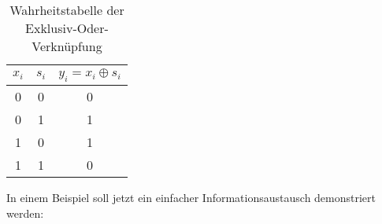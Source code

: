 \begin{table}
  \centering
  \caption{Wahrheitstabelle der Exklusiv-Oder-Verknüpfung}
  \begin{tabular}{cc|c}
    $x_i$ & $s_i$ & $y_i = x_i \oplus s_i$ \\ \hline
    0     & 0     & 0                      \\
    0     & 1     & 1                      \\ \hline
    1     & 0     & 1                      \\
    1     & 1     & 0                      \\
  \end{tabular}
  \label{tab:truth-table-xor}
\end{table}



\noindent
In einem Beispiel soll jetzt ein einfacher Informationsaustausch demonstriert werden:

\newcommand{\streamencryption}{
  \begin{aligned}
    x_0,\dots,x_7 = 01010 & 000_2 = 80_{10} = \text{\texttt{P}}  \\
    \oplus                &                                      \\
    s_0,\dots,s_7 = 00111 & 010_2                                \\
    y_0,\dots,y_7 = 01101 & 010_2 = 106_{10} = \text{\texttt{j}}
  \end{aligned}
}

\newcommand{\streamdecryption}{
  \begin{aligned}
    y_0,\dots,y_7 = 01101 & 010_2 = 106_{10} = \text{\texttt{j}} \\
    \oplus                &                                      \\
    s_0,\dots,s_7 = 00111 & 010_2                                \\
    x_0,\dots,x_7 = 01010 & 000_2 = 80_{10} = \text{\texttt{P}}
  \end{aligned}
}

\newcommand{\streamarrow}{\tikz{\draw[->] (0,0) to
    node[above] {$\text{\texttt{j}} = 01101010_2$} (2,0);}}

